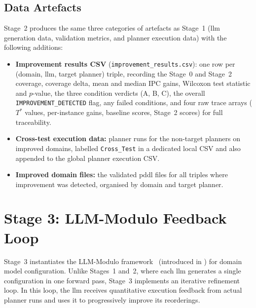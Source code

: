 \subsection{Data Artefacts}
\label{sec:design:stage2:data}

Stage~2 produces the same three categories of artefacts as Stage~1 (\gls{llm} generation data, validation metrics, and planner execution data) with the following additions:

\begin{itemize}
  \item \textbf{Improvement results CSV} (\texttt{improvement\_results.csv}): one row per (domain, \gls{llm}, target planner) triple, recording the Stage~0 and Stage~2 coverage, coverage delta, mean and median IPC gains, Wilcoxon test statistic and $p$-value, the three condition verdicts (A, B, C), the overall \texttt{IMPROVEMENT\_DETECTED} flag, any failed conditions, and four raw trace arrays (\(T^*\) values, per-instance gains, baseline scores, Stage~2 scores) for full traceability.

  \item \textbf{Cross-test execution data:} planner runs for the non-target planners on improved domains, labelled \texttt{Cross\_Test} in a dedicated local CSV and also appended to the global planner execution CSV.

  \item \textbf{Improved domain files:} the validated \gls{pddl} files for all triples where improvement was detected, organised by domain and target planner.
\end{itemize}


\section{Stage 3: LLM-Modulo Feedback Loop}
\label{sec:design:stage3}

Stage~3 instantiates the LLM-Modulo framework~\cite{Kambhampati2024} (introduced in ) for domain model configuration.
Unlike Stages~1 and~2, where each \gls{llm} generates a single configuration in one forward pass, Stage~3 implements an iterative refinement loop. In this loop, the \gls{llm} receives quantitative execution feedback from actual planner runs and uses it to progressively improve its reorderings.

